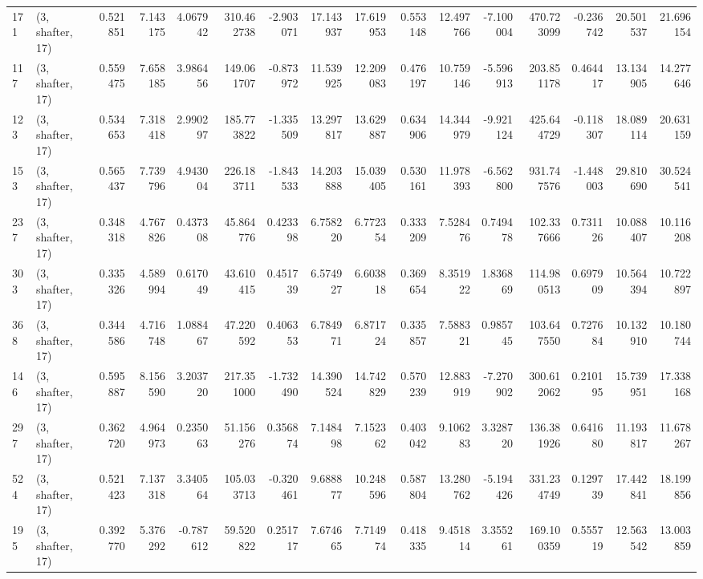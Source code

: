 \begin{tabular}{llrrrrrrrrrrrrrr}
171 &  (3, shafter, 17) &   0.521851 &   7.143175 &   4.067942 &   310.462738 &  -2.903071 &  17.143937 &  17.619953 &  0.553148 &  12.497766 &  -7.100004 &    470.723099 &  -0.236742 &  20.501537 &   21.696154 \\
117 &  (3, shafter, 17) &   0.559475 &   7.658185 &   3.986456 &   149.061707 &  -0.873972 &  11.539925 &  12.209083 &  0.476197 &  10.759146 &  -5.596913 &    203.851178 &   0.464417 &  13.134905 &   14.277646 \\
123 &  (3, shafter, 17) &   0.534653 &   7.318418 &   2.990297 &   185.773822 &  -1.335509 &  13.297817 &  13.629887 &  0.634906 &  14.344979 &  -9.921124 &    425.644729 &  -0.118307 &  18.089114 &   20.631159 \\
153 &  (3, shafter, 17) &   0.565437 &   7.739796 &   4.943004 &   226.183711 &  -1.843533 &  14.203888 &  15.039405 &  0.530161 &  11.978393 &  -6.562800 &    931.747576 &  -1.448003 &  29.810690 &   30.524541 \\
237 &  (3, shafter, 17) &   0.348318 &   4.767826 &   0.437308 &    45.864776 &   0.423398 &   6.758220 &   6.772354 &  0.333209 &   7.528476 &   0.749478 &    102.337666 &   0.731126 &  10.088407 &   10.116208 \\
303 &  (3, shafter, 17) &   0.335326 &   4.589994 &   0.617049 &    43.610415 &   0.451739 &   6.574927 &   6.603818 &  0.369654 &   8.351922 &   1.836869 &    114.980513 &   0.697909 &  10.564394 &   10.722897 \\
368 &  (3, shafter, 17) &   0.344586 &   4.716748 &   1.088467 &    47.220592 &   0.406353 &   6.784971 &   6.871724 &  0.335857 &   7.588321 &   0.985745 &    103.647550 &   0.727684 &  10.132910 &   10.180744 \\
146 &  (3, shafter, 17) &   0.595887 &   8.156590 &   3.203720 &   217.351000 &  -1.732490 &  14.390524 &  14.742829 &  0.570239 &  12.883919 &  -7.270902 &    300.612062 &   0.210195 &  15.739951 &   17.338168 \\
297 &  (3, shafter, 17) &   0.362720 &   4.964973 &   0.235063 &    51.156276 &   0.356874 &   7.148498 &   7.152362 &  0.403042 &   9.106283 &   3.328720 &    136.381926 &   0.641680 &  11.193817 &   11.678267 \\
524 &  (3, shafter, 17) &   0.521423 &   7.137318 &   3.340564 &   105.033713 &  -0.320461 &   9.688877 &  10.248596 &  0.587804 &  13.280762 &  -5.194426 &    331.234749 &   0.129739 &  17.442841 &   18.199856 \\
195 &  (3, shafter, 17) &   0.392770 &   5.376292 &  -0.787612 &    59.520822 &   0.251717 &   7.674665 &   7.714974 &  0.418335 &   9.451814 &   3.355261 &    169.100359 &   0.555719 &  12.563542 &   13.003859 \\

\end{tabular}

